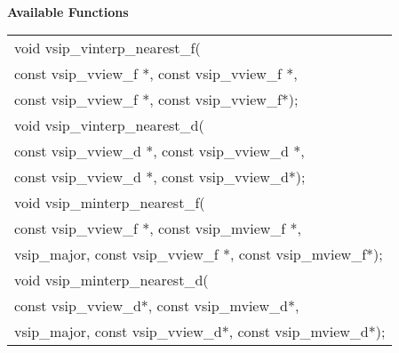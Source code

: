 \\\cvsiplh
\newline \hspace*{.8cm} \vspace*{.1cm} \textbf{Available Functions }
\newline \hspace*{1.1cm} {
\ttfamily
\begin{tabular}[H]{l}
void vsip\_vinterp\_nearest\_f(\\*\hspace*{1cm}const vsip\_vview\_f *, const vsip\_vview\_f *,
\\*\hspace*{1cm}const vsip\_vview\_f *, const vsip\_vview\_f*);\\
void vsip\_vinterp\_nearest\_d(\\*\hspace*{1cm}const vsip\_vview\_d *, const vsip\_vview\_d *,
\\*\hspace*{1cm}const vsip\_vview\_d *, const vsip\_vview\_d*);\\
void vsip\_minterp\_nearest\_f(\\*\hspace*{1cm}const vsip\_vview\_f *, const vsip\_mview\_f *,
\\*\hspace*{1cm}vsip\_major, const vsip\_vview\_f *, const vsip\_mview\_f*);\\
void vsip\_minterp\_nearest\_d(\\*\hspace*{1cm}const vsip\_vview\_d*, const vsip\_mview\_d*,
\\*\hspace*{1cm}vsip\_major, const vsip\_vview\_d*, const vsip\_mview\_d*);\\
\end{tabular}
}\\
\\\pyjvsiph
